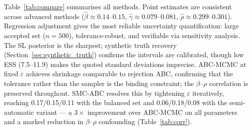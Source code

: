 \documentclass[11pt, a4paper]{article}
\begin{document}
Table~\ref{tab:compare} summarises all methods.
Point estimates are consistent across advanced methods
($\hat\beta\approx0.14$–$0.15$, $\hat\gamma\approx0.079$–$0.081$,
$\hat\rho\approx0.299$–$0.301$).
Regression adjustment gives the most reliable uncertainty quantification:
large accepted set ($n=500$), tolerance-robust, and verifiable via
sensitivity analysis.
The SL posterior is the sharpest; synthetic truth recovery
(Section~\ref{sec:synthetic_truth}) confirms the intervals are calibrated,
though low ESS (7.5–11.9) makes the quoted standard deviations imprecise.
ABC-MCMC at fixed $\varepsilon$ achieves shrinkage comparable to rejection
ABC, confirming that the tolerance rather than the sampler is the binding
constraint; the $\beta$--$\rho$ correlation is preserved throughout.
SMC-ABC resolves this by tightening $\varepsilon$ iteratively, reaching
0.17/0.15/0.11 with the balanced set and 0.06/0.18/0.08 with the
semi-automatic variant — a $3\times$ improvement over ABC-MCMC on all
parameters and a marked reduction in $\beta$--$\rho$ confounding
(Table~\ref{tab:corr}).
\end{document}
